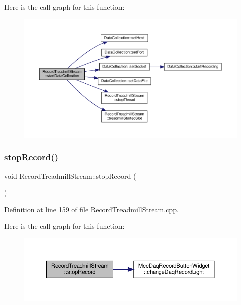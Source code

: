 Here is the call graph for this function\+:
\nopagebreak
\begin{figure}[H]
\begin{center}
\leavevmode
\includegraphics[width=350pt]{class_record_treadmill_stream_a058913f2f5796ef722ee0270382cf5a4_cgraph}
\end{center}
\end{figure}
\mbox{\label{class_record_treadmill_stream_a6829046db76436c6298b1cd21f33b6e7}} 
\subsubsection{\texorpdfstring{stop\+Record()}{stopRecord()}}
{\footnotesize\ttfamily void Record\+Treadmill\+Stream\+::stop\+Record (\begin{DoxyParamCaption}{ }\end{DoxyParamCaption})}



Definition at line 159 of file Record\+Treadmill\+Stream.\+cpp.

Here is the call graph for this function\+:
\nopagebreak
\begin{figure}[H]
\begin{center}
\leavevmode
\includegraphics[width=350pt]{class_record_treadmill_stream_a6829046db76436c6298b1cd21f33b6e7_cgraph}
\end{center}
\end{figure}
\mbox{\label{class_record_treadmill_stream_a4ab55dd8bf6498780d3fc92a6ae545f1}} 
